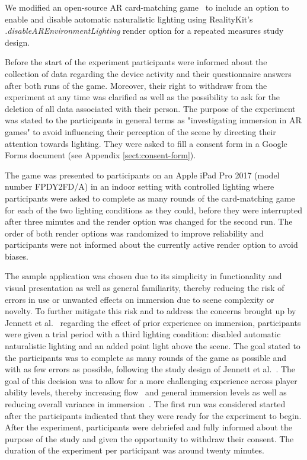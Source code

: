 \documentclass[12pt,twoside,english]{article}
\begin{document}
We modified an open-source \gls{AR} card-matching game~\cite{cobb_maxxfrazerrealitykit-cardflip_2020} to include an option to enable and disable automatic naturalistic lighting using RealityKit's \textit{.disableAREnvironmentLighting} render option for a repeated measures study design.

Before the start of the experiment participants were informed about the collection of data regarding the device activity and their questionnaire answers after both runs of the game.
Moreover, their right to withdraw from the experiment at any time was clarified as well as the possibility to ask for the deletion of all data associated with their person.
The purpose of the experiment was stated to the participants in general terms as "investigating immersion in \gls{AR} games" to avoid influencing their perception of the scene by directing their attention towards lighting. 
They were asked to fill a consent form in a Google Forms document (see Appendix \ref{sect:consent-form}).

The game was presented to participants on an Apple iPad Pro 2017 (model number FPDY2FD/A) in an indoor setting with controlled lighting where participants were asked to complete as many rounds of the card-matching game for each of the two lighting conditions as they could, before they were interrupted after three minutes and the render option was changed for the second run.
The order of both render options was randomized to improve reliability and participants were not informed about the currently active render option to avoid biases.

The sample application was chosen due to its simplicity in functionality and visual presentation as well as general familiarity, thereby reducing the risk of errors in use or unwanted effects on immersion due to scene complexity or novelty.
To further mitigate this risk and to address the concerns brought up by Jennett et al.~\cite{jennett_measuring_2008} regarding the effect of prior experience on immersion, participants were given a trial period with a third lighting condition: disabled automatic naturalistic lighting and an added point light above the scene.
The goal stated to the participants was to complete as many rounds of the game as possible and with as few errors as possible, following the study design of Jennett et al.~\cite{jennett_measuring_2008}.
The goal of this decision was to allow for a more challenging experience across player ability levels, thereby increasing flow~\cite{csikszentmihalyi_flow_1990} and general immersion levels as well as reducing overall variance in immersion~\cite{jennett_measuring_2008}.
The first run was considered started after the participants indicated that they were ready for the experiment to begin.
After the experiment, participants were debriefed and fully informed about the purpose of the study and given the opportunity to withdraw their consent.
The duration of the experiment per participant was around twenty minutes.
\end{document}
